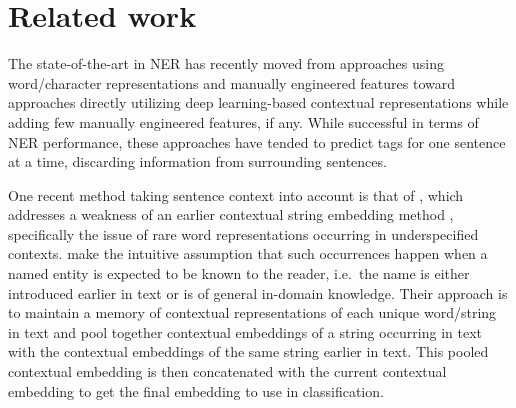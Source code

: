 \section{Related work}

The state-of-the-art in NER has recently moved from approaches using word/character representations and manually engineered features \cite{passos-etal-2014-lexicon,Chiu_2016} toward approaches directly utilizing deep learning-based contextual representations \cite{akbik2018coling,Peters_2018,devlin2018bert,Baevski_2019} while adding few manually engineered features, if any. While successful in terms of NER performance, these approaches have tended to predict tags for one sentence at a time, discarding information from surrounding sentences.

One recent method taking sentence context into account is that of , which addresses a weakness of an earlier contextual string embedding method \cite{akbik2018coling}, specifically the issue of rare word representations occurring in underspecified contexts.  make the intuitive assumption that such occurrences happen when a named entity is expected to be known to the reader, i.e.\ the name is either introduced earlier in text or is of general in-domain knowledge. Their approach is to maintain a memory of contextual representations of each unique word/string in text and pool together contextual embeddings of a string occurring in text with the contextual embeddings of the same string earlier in text. This pooled contextual embedding is then concatenated with the current contextual embedding to get the final embedding to use in classification.

